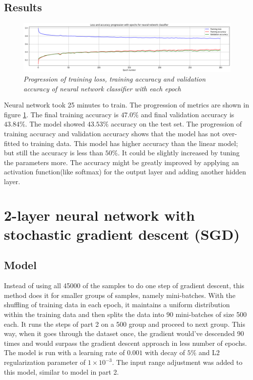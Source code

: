 \documentclass[10pt, a4paper, twocolumn]{article}
\begin{document}
\subsection{Results}
\begin{figure}
  \centering
	\includegraphics[width=.49\textwidth]{./images/nn1Loss.png}
	\caption{\textit{Progression of training loss, training accuracy and validation accuracy of neural network classifier with each epoch}}
	\label{fig:nn1Loss}
\end{figure}
Neural network took 25 minutes to train. The progression of metrics are shown in figure \ref{fig:nn1Loss}. The final training accuracy is $47.0\%$ and final validation accuracy is $43.84\%$. The model showed $43.53\%$ accuracy on the test set. The progression of training accuracy and validation accuracy shows that the model has not over-fitted to training data. This model has higher accuracy than the linear model; but still the accuracy is less than $50\%$. It could be slightly increased by tuning the parameters more. The accuracy might be greatly improved by applying an activation function(like softmax) for the output layer and adding another hidden layer.

\section{2-layer neural network with stochastic gradient descent (SGD)}
\subsection{Model}
Instead of using all 45000 of the samples to do one step of gradient descent, this method does it for smaller groups of samples, namely mini-batches. With the shuffling of training data in each epoch, it maintains a uniform distribution within the training data and then splits the data into 90 mini-batches of size 500 each. It runs the steps of part 2 on a 500 group and proceed to next group. This way, when it goes through the dataset once, the gradient would've descended 90 times and would surpass the gradient descent approach in less number of epochs.\\
The model is run with a learning rate of $0.001$ with decay of $5\%$ and L2 regularization parameter of $1 \times 10^{-3}$. The input range adjustment was added to this model, similar to model in part 2.
\end{document}
